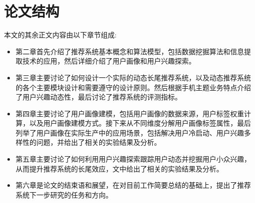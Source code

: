 	\section{论文结构}
		本文的其余正文内容由以下章节组成:
		\begin{itemize}
			\item 第二章首先介绍了推荐系统基本概念和算法模型，包括数据挖掘算法\citep{date-mining}和信息提取技术\citep{info-retrieval}的应用，然后详细介绍了用户画像和用户兴趣探索。
			\item 第三章主要讨论了如何设计一个实际的动态长尾推荐系统，以及动态推荐系统的各个主要模块设计和需要遵守的设计原则。然后根据手机主题业务特点介绍了用户兴趣动态性，最后讨论了推荐系统的评测指标。
			\item 第四章主要讨论了用户画像建模，包括用户画像的数据来源，用户标签权重计算，以及用户画像建模方式。接下来从不同维度分解用户画像标签属性，最后列举了用户画像在实际生产中的应用场景，包括解决用户冷启动、用户兴趣多样性的问题，并给出了相关的实验结果及分析。
			\item 第五章主要讨论了如何利用用户兴趣探索跟踪用户动态并挖掘用户小众兴趣，从而提升推荐系统的长尾效应，文中给出了相关的实验结果及分析。
			\item 第六章是论文的结束语和展望，在对目前工作简要总结的基础上，提出了推荐系统下一步研究的任务和方向。
		\end{itemize}